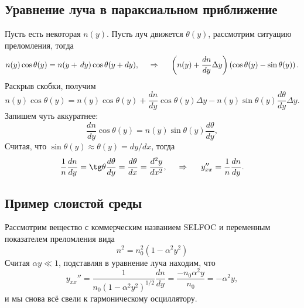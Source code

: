 \subsection{Уравнение луча в параксиальном приближение}

Пусть есть некоторая $n(y)$. Пусть луч движется $\theta (y)$, рассмотрим ситуацию преломления, тогда
\begin{equation*}
    n(y) \cos \theta(y) = n (y + \, d y) \cos \theta(y + d y),
    \hspace{0.5cm} \Rightarrow \hspace{0.5cm}
    \left(
        n(y) + \frac{d n}{d y} \Delta y
    \right)  \left(
        \cos \theta(y) - \sin \theta(y)
    \right).
\end{equation*}
Раскрыв скобки, получим
\begin{equation*}
    n(y) \cos \theta(y) = n(y) \cos \theta(y) + \frac{d n}{d y} \cos \theta(y) \Delta y - n(y) \sin \theta(y) \frac{d \theta}{d y} \Delta y.
\end{equation*}
Запишем чуть аккуратнее:
\begin{equation*}
    \frac{d n}{d y} \cos \theta(y) = n(y) \sin \theta(y) \frac{d \theta}{d y},
\end{equation*}
Считая, что $\sin \theta(y) \approx \theta(y) = d y /d x$, тогда
\begin{equation}
    \frac{1}{n} \frac{d n}{d y} = \tg \theta \frac{d \theta}{d y} = \frac{d \theta}{d x} = \frac{d^2 y}{d x^2},
    \hspace{0.5cm} \Rightarrow \hspace{0.5cm}
    y_{xx}'' = \frac{1}{n}\frac{d n}{d y}.
\end{equation}




\subsection{Пример слоистой среды}


Рассмотрим вещество с коммерческим названием SELFOC и переменным показателем преломления вида
\begin{equation*}
    n^2 = n_0^2 (1 - \alpha^2 y^2) 
\end{equation*}
Считая $\alpha y \ll 1$, подставляя в уравнение луча находим, что
\begin{equation*}
    y_{xx}'' = \frac{1}{n_0(1-\alpha^2 y^2)^{1/2}} \frac{d n}{d y} =
    \frac{-n_0 \alpha^2 y}{n_0} = - \alpha^2 y,
\end{equation*}
и мы снова всё свели к гармоническому осциллятору.

\phantom{42}

\noindent
{}